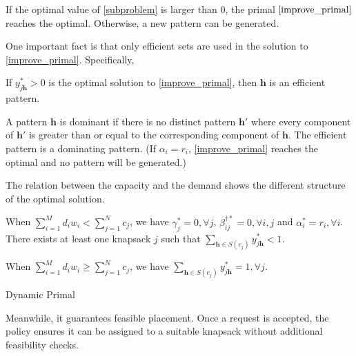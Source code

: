 If the optimal value of \eqref{subproblem} is larger than $0$, the primal $\eqref{improve_primal}$ reaches the optimal. Otherwise, a new pattern can be generated.

One important fact is that only efficient sets are used in the solution to \eqref{improve_primal}. Specifically, 

\begin{lem}
    If $y_{j \bm{h}}^{*} > 0$ is the optimal solution to \eqref{improve_primal}, then $\bm{h}$ is an efficient pattern.
\end{lem}


A pattern $\bm{h}$ is dominant if there is no distinct pattern $\bm{h}{'}$ where every component of $\bm{h}{'}$ is greater than or equal to the corresponding component of $\bm{h}$. The efficient pattern is a dominating pattern. (If $\alpha_{i} = r_i$, \eqref{improve_primal} reaches the optimal and no pattern will be generated.)

The relation between the capacity and the demand shows the different structure of the optimal solution.

\begin{lem}
When $\sum_{i=1}^{M} d_{i} w_{i} < \sum_{j=1}^{N} c_{j}$, we have $\gamma_{j}^{*} =0, \forall j$, $\beta_{ij}^{\dag *} =0, \forall i,j$ and $\alpha^{*}_{i} = r_i, \forall i$. There exists at least one knapsack $j$ such that $\sum_{\bm{h} \in S(c_{j})} y_{j \bm{h}}^{*} < 1$.

When $\sum_{i=1}^{M} d_{i} w_{i} \geq \sum_{j=1}^{N} c_{j}$, we have $\sum_{\bm{h} \in S(c_{j})} y_{j \bm{h}}^{*} = 1, \forall j$.
\end{lem}


\begin{algorithm}[H]
    \caption{Dynamic Primal}\label{algo_improve_primal}
\end{algorithm}

Meanwhile, it guarantees feasible placement. Once a request is accepted, the policy ensures it can be assigned to a suitable knapsack without additional feasibility checks.

